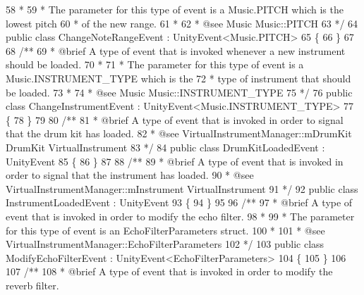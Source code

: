 \begin{DoxyCodeInclude}
58 \textcolor{comment}{     * }
59 \textcolor{comment}{     * The parameter for this type of event is a Music.PITCH which is the lowest pitch}
60 \textcolor{comment}{     * of the new range.}
61 \textcolor{comment}{     * }
62 \textcolor{comment}{     * @see Music Music::PITCH}
63 \textcolor{comment}{    */}
64     \textcolor{keyword}{public} \textcolor{keyword}{class }ChangeNoteRangeEvent : UnityEvent<Music.PITCH>
65     \{
66     \}
67 \textcolor{comment}{}
68 \textcolor{comment}{    /** }
69 \textcolor{comment}{     * @brief A type of event that is invoked whenever a new instrument should be loaded. }
70 \textcolor{comment}{     * }
71 \textcolor{comment}{     * The parameter for this type of event is a Music.INSTRUMENT\_TYPE which is the }
72 \textcolor{comment}{     * type of instrument that should be loaded.}
73 \textcolor{comment}{     * }
74 \textcolor{comment}{     * @see Music Music::INSTRUMENT\_TYPE}
75 \textcolor{comment}{    */}
76     \textcolor{keyword}{public} \textcolor{keyword}{class }ChangeInstrumentEvent : UnityEvent<Music.INSTRUMENT\_TYPE>
77     \{
78     \}
79 \textcolor{comment}{}
80 \textcolor{comment}{    /** }
81 \textcolor{comment}{     * @brief A type of event that is invoked in order to signal that the drum kit has loaded. }
82 \textcolor{comment}{     * @see VirtualInstrumentManager::mDrumKit DrumKit VirtualInstrument}
83 \textcolor{comment}{    */}
84     \textcolor{keyword}{public} \textcolor{keyword}{class }DrumKitLoadedEvent : UnityEvent
85     \{
86     \}
87 \textcolor{comment}{}
88 \textcolor{comment}{    /** }
89 \textcolor{comment}{     * @brief A type of event that is invoked in order to signal that the instrument has loaded. }
90 \textcolor{comment}{     * @see VirtualInstrumentManager::mInstrument VirtualInstrument }
91 \textcolor{comment}{    */}
92     \textcolor{keyword}{public} \textcolor{keyword}{class }InstrumentLoadedEvent : UnityEvent
93     \{
94     \}
95 \textcolor{comment}{}
96 \textcolor{comment}{    /** }
97 \textcolor{comment}{     * @brief A type of event that is invoked in order to modify the echo filter.}
98 \textcolor{comment}{     * }
99 \textcolor{comment}{     * The parameter for this type of event is an EchoFilterParameters struct.}
100 \textcolor{comment}{     *  }
101 \textcolor{comment}{     * @see VirtualInstrumentManager::EchoFilterParameters  }
102 \textcolor{comment}{    */}
103     \textcolor{keyword}{public} \textcolor{keyword}{class }ModifyEchoFilterEvent : UnityEvent<EchoFilterParameters>
104     \{
105     \}
106 \textcolor{comment}{}
107 \textcolor{comment}{    /** }
108 \textcolor{comment}{     * @brief A type of event that is invoked in order to modify the reverb filter.}

\end{DoxyCodeInclude}
